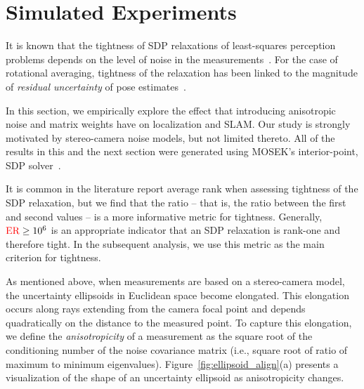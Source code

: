 \documentclass[lettersize,journal]{IEEEtran}
\newcommand{\rev}[1]{\color{red}{#1}\color{black}}
\begin{document}
\section{Simulated Experiments}\label{sec:Simulations}

It is known that the tightness of SDP relaxations of least-squares perception problems depends on the level of noise in the measurements~\cite{brialesConvexGlobal3D2017, rosenSESyncCertifiablyCorrect2019, cifuentesLocalStabilitySemidefinite2022}. For the case of rotational averaging, tightness of the relaxation has been linked to the magnitude of \textit{residual uncertainty} of pose estimates~\cite{erikssonRotationAveragingStrong2018}.

In this section, we empirically explore the effect that introducing anisotropic noise and matrix weights have on localization and SLAM. Our study is strongly motivated by stereo-camera noise models, but not limited thereto. 
All of the results in this and the next section were generated using MOSEK's interior-point, SDP solver~\cite{mosek}.

It is common in the literature report average rank when assessing tightness of the SDP relaxation, but we find that the \rev{eigenvalue } ratio \rev{(ER) of the optimal solution } -- that is, the ratio between the first and second \rev{eigen}values -- is a more informative metric for tightness. Generally, $\mbox{\rev{ER}}\geq 10^6$ is an appropriate indicator that an SDP relaxation is rank-one and therefore tight. In the subsequent analysis, we use this metric as the main criterion for tightness. 

As mentioned above, when measurements are based on a stereo-camera model, the uncertainty ellipsoids in Euclidean space become elongated. This elongation occurs along rays extending from the camera focal point and depends quadratically on the distance to the measured point. To capture this elongation, we define the \textit{anisotropicity} of a measurement as the square root of the conditioning number of the noise covariance matrix (i.e., square root of ratio of maximum to minimum eigenvalues). Figure~\ref{fig:ellipsoid_align}(a) presents a visualization of the shape of an uncertainty ellipsoid as anisotropicity changes.
\end{document}
